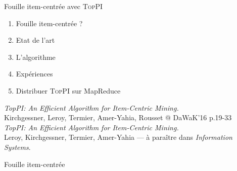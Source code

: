\documentclass[table]{beamer}
\providecommand{\toppi}{\mbox{\textsc{TopPI}}}
\begin{document}
\begin{frame}{Fouille item-centrée avec \toppi}
  \begin{enumerate}
    \item Fouille item-centrée ?
    \item Etat de l'art
    \item L'algorithme
    \item Expériences
    \item Distribuer \toppi{} sur MapReduce
  \end{enumerate}
  \vfill
  \begin{footnotesize}
    {\em TopPI: An Efficient Algorithm for Item-Centric Mining.}\\
    Kirchgessner, Leroy, Termier, Amer-Yahia, Rousset @ DaWaK'16 p.19-33 \\
    \vspace{1em}
    {\em TopPI: An Efficient Algorithm for Item-Centric Mining.}\\
    Leroy, Kirchgessner, Termier, Amer-Yahia --- à paraître dans {\em Information Systems}.
  \end{footnotesize}
\end{frame}


\begin{frame}[t]{Fouille item-centrée}
  \begin{center}
  \end{center}
\end{frame}
\end{document}
